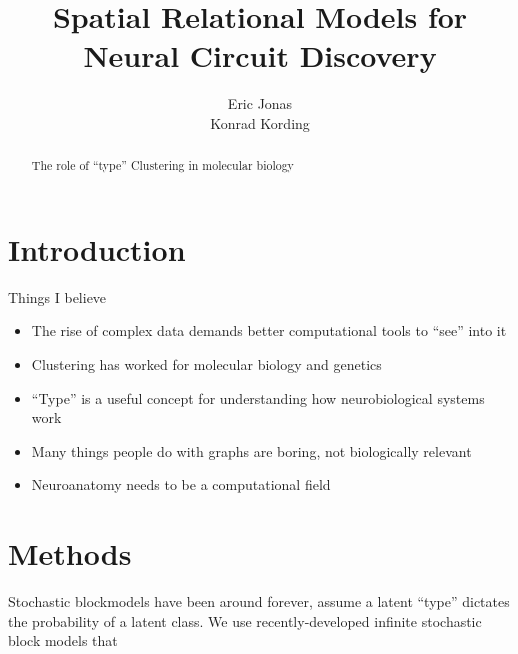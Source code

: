 \documentclass{article}
\title{Spatial Relational Models for Neural Circuit Discovery}
\author{Eric Jonas \\ Konrad Kording}
\begin{document}
\maketitle

\listoftodos

\begin{abstract}
  The role of ``type''
  Clustering in molecular biology
\end{abstract}

\section{Introduction}

Things I believe

\begin{itemize}
\item The rise of complex data demands better computational tools to ``see'' into it
\item Clustering has worked for molecular biology and genetics
\item ``Type'' is a useful concept for understanding how neurobiological systems work
\item Many things people do with graphs are boring, not biologically relevant
\item Neuroanatomy needs to be a computational field
\end{itemize}

\section{Methods}
Stochastic blockmodels have been around forever, assume a latent ``type'' dictates
the probability of a latent class. We use recently-developed infinite
stochastic block models that 
\end{document}
